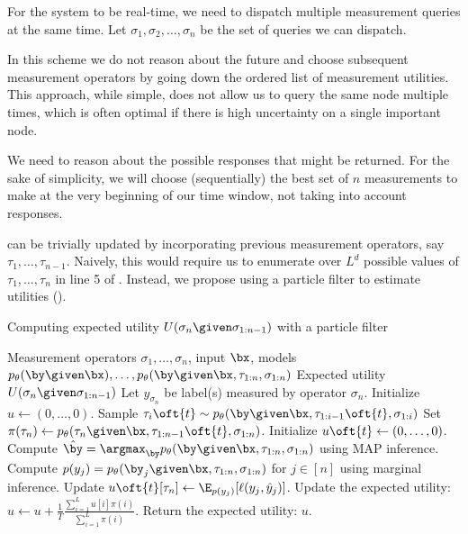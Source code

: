 For the system to be real-time, we need to dispatch multiple measurement queries at the same time.
Let $\sigma_1, \sigma_2, \dots, \sigma_n$ be the set of queries we can dispatch.

\begin{note}
In this scheme we do not reason about the future and choose subsequent measurement operators by going down the ordered list of measurement utilities.
This approach, while simple, does not allow us to query the same node multiple times, which is often optimal if there is high uncertainty on a single important node.
\end{note}

We need to reason about the possible responses that might be returned.
For the sake of simplicity, we will choose (sequentially) the best set of $n$ measurements to make at the very beginning of our time window, not taking into account responses.

 can be trivially updated by incorporating previous measurement operators, say $\tau_1, \dots, \tau_{n-1}$.
Naively, this would require us to enumerate over $L^d$ possible values of $\tau_1, \dots, \tau_n$ in line 5 of .
Instead, we propose using a particle filter to estimate utilities ().

\begin{algorithm}
\renewcommand{\algorithmicrequire}{\textbf{Input:}}
\renewcommand{\algorithmicensure}{\textbf{Output:}}
\caption{Computing expected utility $U(\sigma_n \given \sigma_{1:n-1})$ with a particle filter}
  \label{algo:expected-utility}
  \begin{algorithmic}[1]
    \REQUIRE Measurement operators $\sigma_1, \dots, \sigma_n$, input $\bx$, models $p_\theta(\by \given \bx), \dots, p_\theta(\by \given \bx, \tau_{1:n}, \sigma_{1:n})$
    \ENSURE Expected utility $U(\sigma_n \given \sigma_{1:n-1})$
    \STATE Let $y_{\sigma_n}$ be label(s) measured by operator $\sigma_n$.
    \STATE Initialize $u \gets (0, \dots, 0)$.
      \STATE Sample $\tau_i\oft{t} \sim \p(\by \given \bx, \tau_{1:i-1}\oft{t}, \sigma_{1:i})$
      \ENDFOR
      \STATE Set $\pi(\tau_n) \gets \p(\tau_n \given \bx, \tau_{1:n-1}\oft{t}, \sigma_{1:n})$.
      \STATE Initialize $u\oft{t} \gets (0, \dots, 0)$.
      \STATE Compute $\byt = \argmax_{\by} p_\theta(\by \given \bx, \tau_{1:n}, \sigma_{1:n})$ using MAP inference.
      \STATE Compute $p(y_j) = p_\theta(\by_j \given \bx, \tau_{1:n}, \sigma_{1:n})$ for $j \in [n]$ using marginal inference.
      \STATE Update $u\oft{t}[\tau_n] \gets \E_{p(y_j)}[\ell(y_j, \yt_j)]$.
      \ENDFOR
      \STATE Update the expected utility: $u \gets u + \frac{1}{T} \frac{\sum_{i=1}^L u[i] \pi(i)}{\sum_{i=1}^L \pi(i)}$.
    \ENDFOR
    \STATE Return the expected utility: $u$.
  \end{algorithmic}
\end{algorithm}

